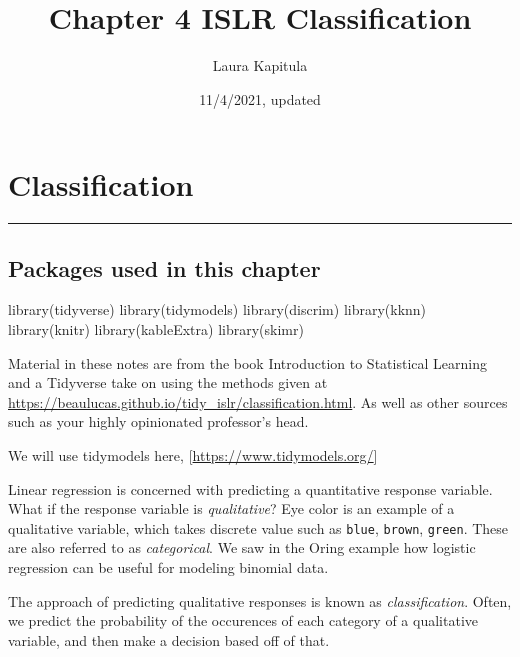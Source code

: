 \documentclass[
]{article}
\title{Chapter 4 ISLR Classification}
\author{Laura Kapitula}
\date{11/4/2021, updated}
\newenvironment{Shaded}{\begin{snugshade}}{\end{snugshade}}
\newcommand{\FunctionTok}[1]{\textcolor[rgb]{0.00,0.00,0.00}{#1}}
\newcommand{\NormalTok}[1]{#1}
\begin{document}
\maketitle

\hypertarget{classification}{%
\section{Classification}\label{classification}}

\begin{center}\rule{0.5\linewidth}{0.5pt}\end{center}

\hypertarget{packages-used-in-this-chapter}{%
\subsection{Packages used in this
chapter}\label{packages-used-in-this-chapter}}

\begin{Shaded}
\begin{Highlighting}[]
\FunctionTok{library}\NormalTok{(tidyverse)}
\FunctionTok{library}\NormalTok{(tidymodels)}
\FunctionTok{library}\NormalTok{(discrim)}
\FunctionTok{library}\NormalTok{(kknn)}
\FunctionTok{library}\NormalTok{(knitr)}
\FunctionTok{library}\NormalTok{(kableExtra)}
\FunctionTok{library}\NormalTok{(skimr)}
\end{Highlighting}
\end{Shaded}

Material in these notes are from the book Introduction to Statistical
Learning and a Tidyverse take on using the methods given at
\url{https://beaulucas.github.io/tidy_islr/classification.html}. As well
as other sources such as your highly opinionated professor's head.

We will use tidymodels here, {[}\url{https://www.tidymodels.org/}{]}

Linear regression is concerned with predicting a quantitative response
variable. What if the response variable is \emph{qualitative}? Eye color
is an example of a qualitative variable, which takes discrete value such
as \texttt{blue}, \texttt{brown}, \texttt{green}. These are also
referred to as \emph{categorical}. We saw in the Oring example how
logistic regression can be useful for modeling binomial data.

The approach of predicting qualitative responses is known as
\emph{classification}. Often, we predict the probability of the
occurences of each category of a qualitative variable, and then make a
decision based off of that.
\end{document}
